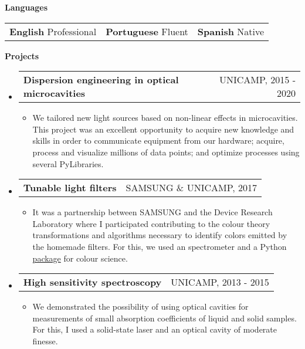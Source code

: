 \documentclass[letterpaper,12pt]{article}[leftmargin=*]
\makeatletter
\def \entryspacing {-0pt}
\renewcommand{\section}[2]{\vspace{5pt}
  \colorbox{secondary}{\color{white}\raggedbottom\normalsize\textbf{{#1}{\hspace{7pt}#2}}}
}
\newcommand{\resumeEntryStart}{\begin{itemize}[leftmargin=2.5mm]}
\newcommand{\resumeEntryEnd}{\end{itemize}\vspace{\entryspacing}}
\newcommand{\resumeItemListStart}{\begin{itemize}[leftmargin=4.5mm]}
\newcommand{\resumeItemListEnd}{\end{itemize}}
\newcommand{\resumeItem}[1]{
  \item\small{
    {#1 \vspace{-2pt}}
  }
}
\newcommand{\resumeEntryTD}[2]{
  \vspace{-1pt}\item[]
    \begin{tabularx}{0.97\textwidth}{X@{\hspace{60pt}}r}
      \textbf{\color{primary}#1} & {\firabook\color{accent}\small#2} \\
    \end{tabularx}\vspace{-6pt}
}
\newcommand{\resumeEntryS}[2]{
  \item[]\small{
    \textbf{\color{primary}#1 }{ #2 \vspace{-6pt}}
  }
}
\newcommand{\triplecol}[3]{
	\begin{tabularx}{\textwidth}{XXX}
	{\small#1} & {\small#2} & {\small#3}\\
	\end{tabularx}
}
\makeatother
\begin{document}
\section{\faComment}{Languages}
\vspace{-0.5cm}
\resumeEntryStart
	\triplecol{\resumeEntryS{English} {Professional}}{\resumeEntryS{Portuguese}{Fluent}}{\resumeEntryS{Spanish}{Native}}
\resumeEntryEnd
\vspace{-0.1cm}

\section{\faFlask}{Projects}
\vspace{-0.1cm}

\resumeEntryStart
\resumeEntryTD
{Dispersion engineering in optical microcavities}{UNICAMP, 2015 - 2020}
\resumeItemListStart
\resumeItem{We tailored new light sources based on non-linear effects in microcavities. This project was an excellent opportunity to acquire new knowledge and skills in order to communicate equipment from our hardware; acquire, process and visualize millions of data points; and optimize processes using several PyLibraries.}
\resumeItemListEnd
\resumeEntryEnd

\vspace{-0.5cm}

\resumeEntryStart
\resumeEntryTD
{Tunable light filters}{SAMSUNG \& UNICAMP, 2017}
\resumeItemListStart
\resumeItem {It was a partnership between SAMSUNG and the Device Research Laboratory where I participated contributing to the colour theory transformations and algorithms necessary to identify colors emitted by the homemade filters. For this, we used an spectrometer and a Python \href{https://www.colour-science.org/}{package} for colour science.}
\resumeItemListEnd
\resumeEntryEnd

\vspace{-0.5cm}

\resumeEntryStart
\resumeEntryTD
{High sensitivity spectroscopy}{UNICAMP, 2013 - 2015}
\resumeItemListStart
\resumeItem{We demonstrated the possibility of using optical cavities for measurements of small absorption coefficients of liquid and solid samples. For this, I used a solid-state laser and an optical cavity of moderate finesse.}
\resumeItemListEnd
\resumeEntryEnd
\end{document}
